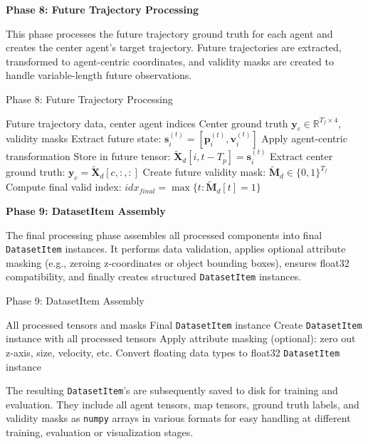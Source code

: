 \textbf{Phase 8: Future Trajectory Processing}

This phase processes the future trajectory ground truth for each agent and creates the center agent's target trajectory. Future trajectories are extracted, transformed to agent-centric coordinates, and validity masks are created to handle variable-length future observations.

\begin{algorithm}[H]
\caption{Phase 8: Future Trajectory Processing}
\label{alg:phase8_future}
\begin{algorithmic}[1]
\REQUIRE Future trajectory data, center agent indices
\ENSURE Center ground truth \(\boldsymbol{y}_c \in \mathbb{R}^{T_f \times 4}\), validity masks
\FOR{each agent \(i\), future timestep \(t \in [T_p, T_p + T_f)\)}
    \STATE Extract future state: \(\boldsymbol{s}_i^{(t)} = [\boldsymbol{p}_i^{(t)}, \boldsymbol{v}_i^{(t)}]\)
    \STATE Apply agent-centric transformation
    \STATE Store in future tensor: \(\tilde{\boldsymbol{X}}_d[i, t-T_p] = \boldsymbol{s}_i^{(t)}\)
\ENDFOR
{}
    \STATE Extract center ground truth: \(\boldsymbol{y}_c = \tilde{\boldsymbol{X}}_d[c, :, :]\)
    \STATE Create future validity mask: \(\tilde{\boldsymbol{M}}_d \in \{0,1\}^{T_f}\)
    \STATE Compute final valid index: \(idx_{final} = \max\{t : \tilde{\boldsymbol{M}}_d[t] = 1\}\)
\ENDFOR
\end{algorithmic}
\end{algorithm}

\textbf{Phase 9: DatasetItem Assembly}

The final processing phase assembles all processed components into final \texttt{DatasetItem} instances. It performs data validation, applies optional attribute masking (e.g., zeroing z-coordinates or object bounding boxes), ensures float32 compatibility, and finally creates structured \texttt{DatasetItem} instances.
\begin{algorithm}[H]
\caption{Phase 9: DatasetItem Assembly}
\label{alg:phase9_assembly}
\begin{algorithmic}[1]
\REQUIRE All processed tensors and masks
\ENSURE Final \texttt{DatasetItem} instance
\STATE Create \texttt{DatasetItem} instance with all processed tensors
\STATE Apply attribute masking (optional): zero out z-axis, size, velocity, etc.
\STATE Convert floating data types to float32
\RETURN \texttt{DatasetItem} instance
\end{algorithmic}
\end{algorithm}

The resulting \texttt{DatasetItem}'s are subsequently saved to disk for training and evaluation. They include all agent tensors, map tensors, ground truth labels, and validity masks as \texttt{numpy} arrays in various formats for easy handling at different training, evaluation or visualization stages.
